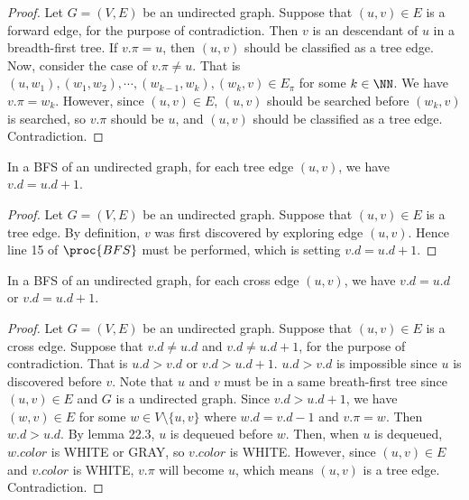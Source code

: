 \begin{proof}
    Let $G = (V,E)$ be an undirected graph.
    Suppose that $(u,v) \in E$ is a forward edge, for the purpose of contradiction.
    Then $v$ is an descendant of $u$ in a breadth-first tree.
    If $v.\pi = u$, then $(u,v)$ should be classified as a tree edge.
    Now, consider the case of $v.\pi \neq u$.
    That is $(u,w_1), (w_1,w_2), \cdots, (w_{k-1},w_k), (w_k, v) \in E_\pi$
    for some $k \in \NN$.
    We have $v.\pi = w_k$.
    However, since $(u,v) \in E$,
    $(u,v)$ should be searched before $(w_k, v)$ is searched,
    so $v.\pi$ should be $u$, and $(u,v)$ should be classified as a tree edge.
    Contradiction.
\end{proof}

\begin{claim}
    In a BFS of an undirected graph,
    for each tree edge $(u,v)$, we have $v.d=u.d+1$.
\end{claim}

\begin{proof}
    Let $G = (V,E)$ be an undirected graph.
    Suppose that $(u,v) \in E$ is a tree edge.
    By definition, $v$ was first discovered by exploring edge $(u,v)$.
    Hence line 15 of $\proc{BFS}$ must be performed,
    which is setting $v.d = u.d + 1$.
\end{proof}

\begin{claim}
    In a BFS of an undirected graph,
    for each cross edge $(u,v)$, we have $v.d=u.d$ or $v.d=u.d+1$.
\end{claim}

\begin{proof}
    Let $G = (V,E)$ be an undirected graph.
    Suppose that $(u,v) \in E$ is a cross edge.
    Suppose that $v.d \neq u.d$ and $v.d \neq u.d+1$,
    for the purpose of contradiction.
    That is $u.d > v.d$ or $v.d > u.d +1$.
    $u.d > v.d$ is impossible since $u$ is discovered before $v$.
    Note that $u$ and $v$ must be in a same breath-first tree
    since $(u,v) \in E$ and $G$ is a undirected graph.
    Since $v.d > u.d + 1$, we have $(w,v) \in E$ 
    for some $w \in V \setminus \{ u, v \}$
    where $w.d = v.d - 1$ and $v.\pi = w$.
    Then $w.d > u.d$.
    By lemma 22.3, $u$ is dequeued before $w$.
    Then, when $u$ is dequeued,
    $w.color$ is WHITE or GRAY,
    so $v.color$ is WHITE.
    However, since $(u,v) \in E$ and $v.color$ is WHITE,
    $v.\pi$ will become $u$,
    which means $(u,v)$ is a tree edge.
    Contradiction.
\end{proof}


